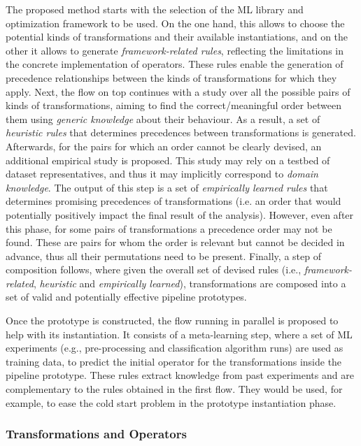 The proposed method starts with the selection of the ML library and optimization framework to be used. On the one hand, this allows to choose the potential kinds of transformations and their available instantiations, and on the other it allows to generate \textit{framework-related rules}, reflecting the limitations in the concrete implementation of operators. These rules enable the generation of precedence relationships between the kinds of transformations for which they apply.
Next, the flow on top continues with a study over all the possible pairs of kinds of transformations, aiming to find the correct/meaningful order between them using \textit{generic knowledge} about their behaviour. As a result, a set of \textit{heuristic rules} that determines precedences between transformations is generated. 
Afterwards, for the pairs for which an order cannot be clearly devised, an additional empirical study is proposed. This study may rely on a testbed of dataset representatives, and thus it may implicitly correspond to \textit{domain knowledge}. The output of this step is a set of \textit{empirically learned rules} that determines promising precedences of transformations (i.e. an order that would potentially positively impact the final result of the analysis). However, even after this phase, for some pairs of transformations a precedence order may not be found. These are pairs for whom the order is relevant but cannot be decided in advance, thus all their permutations need to be present. Finally, a step of composition follows, where given the overall set of devised rules (i.e., \textit{framework-related}, \textit{heuristic} and \textit{empirically learned}), transformations are composed into a set of valid and potentially effective pipeline prototypes. 

Once the prototype is constructed, the flow running in parallel is proposed to help with its instantiation. It consists of a meta-learning step, where a set of ML experiments (e.g., pre-processing and classification algorithm runs) are used as training data, to predict the initial operator for the transformations inside the pipeline prototype. These rules extract knowledge from past experiments and are complementary to the rules obtained in the first flow. They would be used, for example, to ease the cold start problem in the prototype instantiation phase.

\subsubsection{Transformations and Operators}


